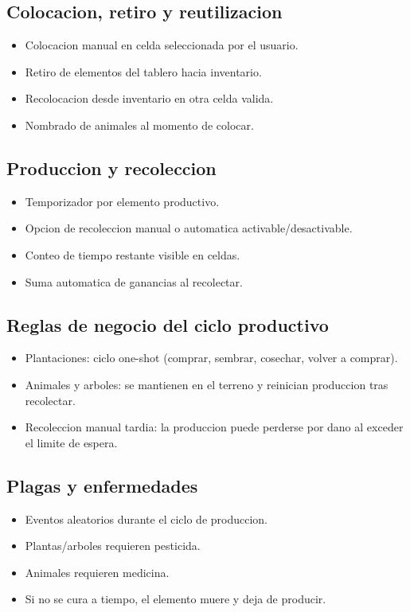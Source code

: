 \documentclass[12pt,a4paper]{article}
\begin{document}
\subsection{Colocacion, retiro y reutilizacion}
\begin{itemize}
    \item Colocacion manual en celda seleccionada por el usuario.
    \item Retiro de elementos del tablero hacia inventario.
    \item Recolocacion desde inventario en otra celda valida.
    \item Nombrado de animales al momento de colocar.
\end{itemize}

\subsection{Produccion y recoleccion}
\begin{itemize}
    \item Temporizador por elemento productivo.
    \item Opcion de recoleccion manual o automatica activable/desactivable.
    \item Conteo de tiempo restante visible en celdas.
    \item Suma automatica de ganancias al recolectar.
\end{itemize}

\subsection{Reglas de negocio del ciclo productivo}
\begin{itemize}
    \item Plantaciones: ciclo one-shot (comprar, sembrar, cosechar, volver a comprar).
    \item Animales y arboles: se mantienen en el terreno y reinician produccion tras recolectar.
    \item Recoleccion manual tardia: la produccion puede perderse por dano al exceder el limite de espera.
\end{itemize}

\subsection{Plagas y enfermedades}
\begin{itemize}
    \item Eventos aleatorios durante el ciclo de produccion.
    \item Plantas/arboles requieren pesticida.
    \item Animales requieren medicina.
    \item Si no se cura a tiempo, el elemento muere y deja de producir.
\end{itemize}
\end{document}
